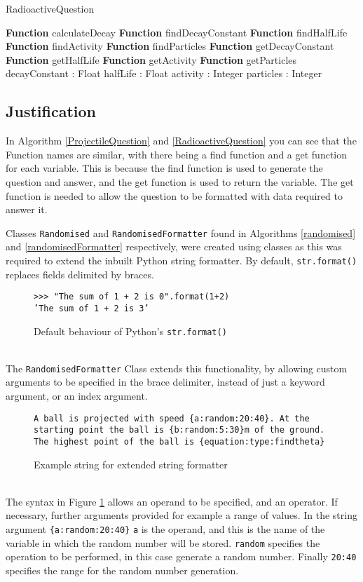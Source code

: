 \begin{algorithm}[h]\label{RadioactiveQuestion}
	\caption{RadioactiveQuestion}
	\begin{algorithmic}[1]
		\public
		\State \textbf{Function} calculateDecay
		\State \textbf{Function} findDecayConstant
		\State \textbf{Function} findHalfLife
		\State \textbf{Function} findActivity
		\State \textbf{Function} findParticles
		\State \textbf{Function} getDecayConstant
		\State \textbf{Function} getHalfLife
		\State \textbf{Function} getActivity
		\State \textbf{Function} getParticles
		\endpublic
		\private
		\State decayConstant : Float
		\State halfLife : Float
		\State activity : Integer
		\State particles : Integer
		\endprivate
		\EndProcedure
	\end{algorithmic}
\end{algorithm}
\clearpage
\subsection{Justification}
In Algorithm \ref{ProjectileQuestion} and \ref{RadioactiveQuestion} you can see that the Function names are similar, with there being a find function and a get function for each variable. This is because the find function is used to generate the question and answer, and the get function is used to return the variable. The get function is needed to allow the question to be formatted with data required to answer it.

Classes \texttt{Randomised} and \texttt{RandomisedFormatter} found in Algorithms \ref{randomised} and \ref{randomisedFormatter} respectively, were created using classes as this was required to extend the inbuilt Python string formatter. By default, \texttt{str.format()} replaces fields delimited by braces\autocite{pystr}.
\begin{figure}[h]
	\centering
	\texttt{>>> "The sum of 1 + 2 is {0}".format(1+2)}\\
	\texttt{'The sum of 1 + 2 is 3'}
	\caption{Default behaviour of Python's \texttt{str.format()}\autocite{pystr}}
\end{figure}
\\
The \texttt{RandomisedFormatter} Class extends this functionality, by allowing custom arguments to be specified in the brace delimiter, instead of just a keyword argument, or an index argument. 
\begin{figure}[h]
	\label{exformat}
	\centering
	\texttt{A ball is projected with speed \{a:random:20:40\}. At the starting point the ball is \{b:random:5:30\}m of the ground. The highest point of the ball is \{equation:type:findtheta\}}
	\caption{Example string for extended string formatter}
\end{figure}
\\
The syntax in Figure \ref{exformat} allows an operand to be specified, and an operator. If necessary, further arguments provided for example a range of values. In the string argument \texttt{\{a:random:20:40\}} \texttt{a} is the operand, and this is the name of the variable in which the random number will be stored. \texttt{random} specifies the operation to be performed, in this case generate a random number. Finally \texttt{20:40} specifies the range for the random number generation.

